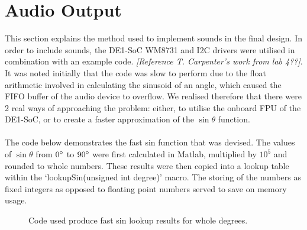 \documentclass[a4paper,12pt]{article}
\begin{document}
\newpage
\section{Audio Output}
\begin{flushleft}
This section explains the method used to implement sounds in the final design. In order to include sounds, the DE1-SoC WM8731 and I2C drivers were utilised in combination with an example code. \textit{[Reference T. Carpenter’s work from lab 4??]}. It was noted initially that the code was slow to perform due to the float arithmetic involved in calculating the sinusoid of an angle, which caused the FIFO buffer of the audio device to overflow. We realised therefore that there were 2 real ways of approaching the problem: either, to utilise the onboard FPU of the DE1-SoC, or to create a faster approximation of the $\sin\theta$ function.
\\ \- \\
The code below demonstrates the fast sin function that was devised. The values of $\sin\theta$ from $0\degree$ to $90\degree$ were first calculated in Matlab, multiplied by $10^5$ and rounded to whole numbers. These results were then copied into a lookup table within the ‘lookupSin(unsigned int degree)’ macro. The storing of the numbers as fixed integers as opposed to floating point numbers served to save on memory usage.

\begin{figure}[H]
	\centering
	
	\caption{Code used produce fast sin lookup results for whole degrees.}
\end{figure}


\end{flushleft}
\end{document}
